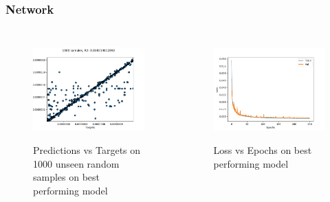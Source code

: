 \documentclass{beamer}
\begin{document}
\begin{frame}
\frametitle{Network}
\begin{columns}

\begin{figure}[h]
    \centering
    \includegraphics[scale=0.4]{diff-plot.png}
    \label{fig:mesh1}
    \caption{Predictions vs Targets on 1000 unseen random samples on best performing model}
\end{figure}

\begin{figure}[h]
    \centering
    \includegraphics[scale=0.4]{loss-plot.png}
    \label{fig:mesh2}
    \caption{Loss vs Epochs on best performing model}
\end{figure}

\end{columns}

\end{frame}
\end{document}
